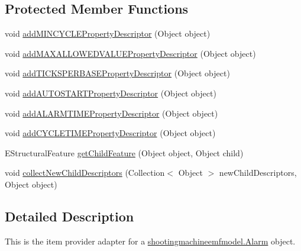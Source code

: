 \subsection*{Protected Member Functions}
\begin{DoxyCompactItemize}
\item 
void \hyperlink{classshootingmachineemfmodel_1_1provider_1_1_alarm_item_provider_aaf555dc3272fb58cc6e915327262d617}{add\-M\-I\-N\-C\-Y\-C\-L\-E\-Property\-Descriptor} (Object object)
\item 
void \hyperlink{classshootingmachineemfmodel_1_1provider_1_1_alarm_item_provider_a0eefa3fa0f15939443a834ef47b8a153}{add\-M\-A\-X\-A\-L\-L\-O\-W\-E\-D\-V\-A\-L\-U\-E\-Property\-Descriptor} (Object object)
\item 
void \hyperlink{classshootingmachineemfmodel_1_1provider_1_1_alarm_item_provider_a6aab361c9827e9912f2e3939d3582bc6}{add\-T\-I\-C\-K\-S\-P\-E\-R\-B\-A\-S\-E\-Property\-Descriptor} (Object object)
\item 
void \hyperlink{classshootingmachineemfmodel_1_1provider_1_1_alarm_item_provider_a13f395148ac5128dc969563e33051ffd}{add\-A\-U\-T\-O\-S\-T\-A\-R\-T\-Property\-Descriptor} (Object object)
\item 
void \hyperlink{classshootingmachineemfmodel_1_1provider_1_1_alarm_item_provider_a0f73dcc920ceccb55c5ec3a2bd076154}{add\-A\-L\-A\-R\-M\-T\-I\-M\-E\-Property\-Descriptor} (Object object)
\item 
void \hyperlink{classshootingmachineemfmodel_1_1provider_1_1_alarm_item_provider_ad43a9f0d0fd6c98932e8e9fe631940dd}{add\-C\-Y\-C\-L\-E\-T\-I\-M\-E\-Property\-Descriptor} (Object object)
\item 
E\-Structural\-Feature \hyperlink{classshootingmachineemfmodel_1_1provider_1_1_alarm_item_provider_a7c09049a3d115dcea6e6f91d4b8d2fb5}{get\-Child\-Feature} (Object object, Object child)
\item 
void \hyperlink{classshootingmachineemfmodel_1_1provider_1_1_alarm_item_provider_a61b2b6017eabc99ac8ab37497640ceaa}{collect\-New\-Child\-Descriptors} (Collection$<$ Object $>$ new\-Child\-Descriptors, Object object)
\end{DoxyCompactItemize}


\subsection{Detailed Description}
This is the item provider adapter for a \hyperlink{interfaceshootingmachineemfmodel_1_1_alarm}{shootingmachineemfmodel.\-Alarm} object.

